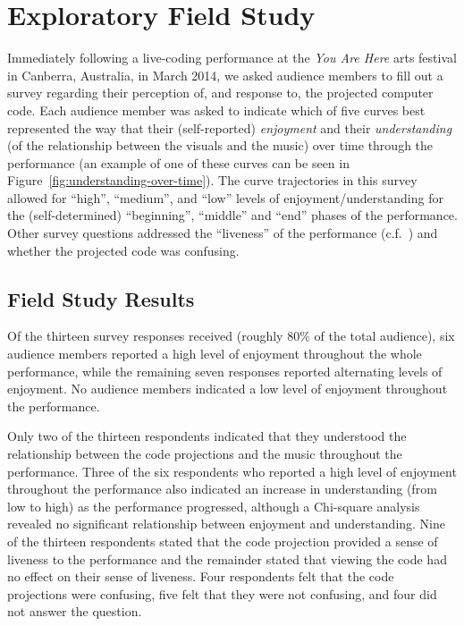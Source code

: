 \documentclass{sig-alternate}
\begin{document}
\section{Exploratory Field Study}

Immediately following a live-coding performance at the \emph{You Are
Here} arts festival in Canberra, Australia, in March 2014, we asked
audience members to fill out a survey regarding their perception of,
and response to, the projected computer code. Each audience member was
asked to indicate which of five curves best represented the way that
their (self-reported) \emph{enjoyment} and their
\emph{understanding} (of the relationship between the visuals and
the music) over time through the performance (an example of one of
these curves can be seen in Figure~\ref{fig:understanding-over-time}).
The curve trajectories in this survey allowed for ``high'',
``medium'', and ``low'' levels of enjoyment/understanding for the
(self-determined) ``beginning'', ``middle'' and ``end'' phases of the
performance. Other survey questions addressed the ``liveness'' of the
performance (c.f.~\cite{Auslander}) and whether the projected code was
confusing.\\

\subsection{Field Study Results}

Of the thirteen survey responses received (roughly $80\%$ of the total
audience), six audience members reported a high level of enjoyment
throughout the whole performance, while the remaining seven responses
reported alternating levels of enjoyment. No audience members
indicated a low level of enjoyment throughout the performance.

Only two of the thirteen respondents indicated that they understood
the relationship between the code projections and the music throughout
the performance. Three of the six respondents who reported a high
level of enjoyment throughout the performance also indicated an
increase in understanding (from low to high) as the performance
progressed, although a Chi-square analysis revealed no significant
relationship between enjoyment and understanding. Nine of the thirteen
respondents stated that the code projection provided a sense of
liveness to the performance and the remainder stated that viewing the
code had no effect on their sense of liveness. Four respondents felt
that the code projections were confusing, five felt that they were not
confusing, and four did not answer the question.
\end{document}
